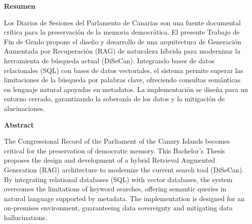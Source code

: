 {\setlength{\parskip}{8mm}
{\huge{\textbf{Resumen}}}

Los Diarios de Sesiones del Parlamento de Canarias son una fuente documental crítica para la preservación de la memoria democrática. El presente Trabajo de Fin de Grado propone el diseño y desarrollo de una arquitectura de Generación Aumentada por Recuperación (RAG) de naturaleza híbrida para modernizar la herramienta de búsqueda actual (DiSeCan). Integrando bases de datos relacionales (SQL) con bases de datos vectoriales, el sistema permite superar las limitaciones de la búsqueda por palabras clave, ofreciendo consultas semánticas en lenguaje natural apoyadas en metadatos. La implementación se diseña para un entorno cerrado, garantizando la soberanía de los datos y la mitigación de alucinaciones.

\newpage

{\huge{\textbf{Abstract}}}

   The Congressional Record of the Parliament of the Canary Islands becomes critical for the preservation of democratic memory. This Bachelor's Thesis proposes the design and development of a hybrid Retrieval Augmented Generation (RAG) architecture to modernize the current search tool (DiSeCan). By integrating relational databases (SQL) with vector databases, the system overcomes the limitations of keyword searches, offering semantic queries in natural language supported by metadata. The implementation is designed for an on-premises environment, guaranteeing data sovereignty and mitigating data hallucinations.

}
